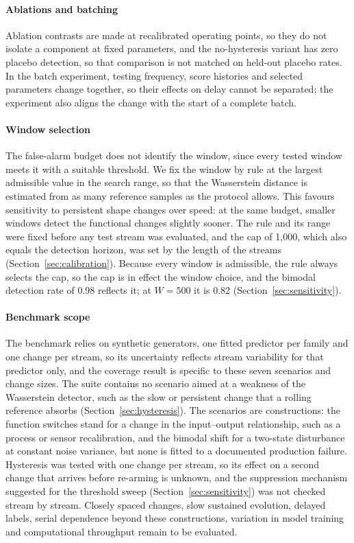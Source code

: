 \documentclass[preprint,12pt]{elsarticle}
\begin{document}
\paragraph{Ablations and batching} Ablation contrasts are made at recalibrated operating points, so they do not isolate a component at fixed parameters, and the no-hysteresis variant has zero placebo detection, so that comparison is not matched on held-out placebo rates. In the batch experiment, testing frequency, score histories and selected parameters change together, so their effects on delay cannot be separated; the experiment also aligns the change with the start of a complete batch.

\paragraph{Window selection} The false-alarm budget does not identify the window, since every tested window meets it with a suitable threshold. We fix the window by rule at the largest admissible value in the search range, so that the Wasserstein distance is estimated from as many reference samples as the protocol allows. This favours sensitivity to persistent shape changes over speed: at the same budget, smaller windows detect the functional changes slightly sooner. The rule and its range were fixed before any test stream was evaluated, and the cap of 1,000, which also equals the detection horizon, was set by the length of the streams (Section~\ref{sec:calibration}). Because every window is admissible, the rule always selects the cap, so the cap is in effect the window choice, and the bimodal detection rate of 0.98 reflects it; at $W=500$ it is 0.82 (Section~\ref{sec:sensitivity}).

\paragraph{Benchmark scope} The benchmark relies on synthetic generators, one fitted predictor per family and one change per stream, so its uncertainty reflects stream variability for that predictor only, and the coverage result is specific to these seven scenarios and change sizes. The suite contains no scenario aimed at a weakness of the Wasserstein detector, such as the slow or persistent change that a rolling reference absorbs (Section~\ref{sec:hysteresis}). The scenarios are constructions: the function switches stand for a change in the input--output relationship, such as a process or sensor recalibration, and the bimodal shift for a two-state disturbance at constant noise variance, but none is fitted to a documented production failure. Hysteresis was tested with one change per stream, so its effect on a second change that arrives before re-arming is unknown, and the suppression mechanism suggested for the threshold sweep (Section~\ref{sec:sensitivity}) was not checked stream by stream. Closely spaced changes, slow sustained evolution, delayed labels, serial dependence beyond these constructions, variation in model training and computational throughput remain to be evaluated.
\end{document}
